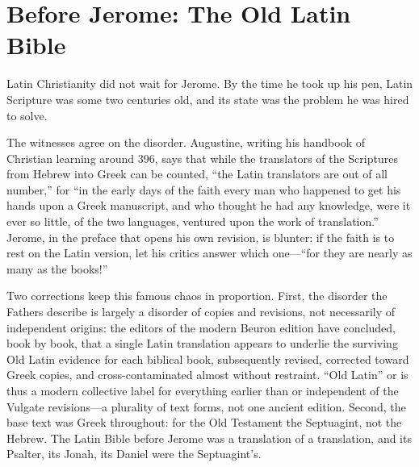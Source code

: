 \section{Before Jerome: The Old Latin Bible}

Latin Christianity did not wait for Jerome. By the time he took up his pen,
Latin Scripture was some two centuries old, and its state was the problem
he was hired to solve.

The witnesses agree on the disorder. Augustine, writing his handbook of
Christian learning around 396, says that while the translators of the
Scriptures from Hebrew into Greek can be counted, ``the Latin translators
are out of all number,'' for ``in the early days of the faith every man who
happened to get his hands upon a Greek manuscript, and who thought he had
any knowledge, were it ever so little, of the two languages, ventured upon
the work of translation.'' Jerome, in the preface that opens his
own revision, is blunter: if the faith is to rest on the Latin version,
let his critics answer which one---``for they are nearly as many as the
books!''

Two corrections keep this famous chaos in proportion. First, the disorder
the Fathers describe is largely a disorder of copies and revisions, not
necessarily of independent origins: the editors of the modern Beuron
 edition have concluded, book by book, that a single
Latin translation appears to underlie the surviving Old Latin evidence for
each biblical book, subsequently revised, corrected toward Greek copies,
and cross-contaminated almost without
restraint.
``Old Latin'' or  is thus a modern collective label for
everything earlier than or independent of the Vulgate revisions---a
plurality of text forms, not one ancient edition. Second, the base text was
Greek throughout: for the Old Testament the Septuagint, not the Hebrew. The
Latin Bible before Jerome was a translation of a translation, and its
Psalter, its Jonah, its Daniel were the Septuagint's.

